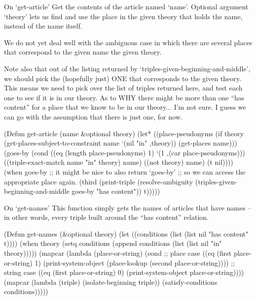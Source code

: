 \begin{notate}{On `get-article'} \label{get-article}
Get the contents of the article named `name'.  Optional
argument `theory' lets us find and use the place in the
given theory that holds the name, instead of the name
itself.

We do not yet deal well with the ambiguous case in which
there are several places that correspond to the given name
the given theory.

Note also that out of the listing returned by
`triples-given-beginning-and-middle', we should pick the
(hopefully just) ONE that corresponds to the given theory.
This means we need to pick over the list of triples
returned here, and test each one to see if it is in our
theory.  As to WHY there might be more than one ``has
content'' for a place that we know to be in our
theory... I'm not sure.  I guess we can go with the
assumption that there is just one, for now.
\end{notate}

\begin{elisp}
(Defun get-article (name &optional theory)
  (let* ((place-pseudonyms
          (if theory
              (get-places-subject-to-constraint
               name `(nil "in" ,theory))
            (get-places name)))
         (goes-by (cond
                    ((eq (length place-pseudonyms) 1)
                     `(1 ,(car place-pseudonyms)))
                    ((triple-exact-match
                      name "in" theory)
                     name)
                    ((not theory) name)
                    (t nil))))
    (when goes-by
      ;; it might be nice to also return `goes-by'
      ;; so we can access the appropriate place again.
      (third (print-triple
              (resolve-ambiguity
               (triples-given-beginning-and-middle
                goes-by "has content"))
              t)))))
\end{elisp}

\begin{notate}{On `get-names'} \label{get-names}
This function simply gets the names of articles that have
names -- in other words, every triple built around the
``has content'' relation.
\end{notate}

\begin{elisp}
(Defun get-names (&optional theory)
  (let ((conditions (list (list nil "has content" t))))
    (when theory
      (setq conditions
            (append conditions
                    (list (list nil "in" theory)))))
    (mapcar
     (lambda (place-or-string)
       (cond
         ;; place case
         ((eq (first place-or-string) 1)
          (print-system-object
           (place-lookup (second place-or-string))))
         ;; string case
         ((eq (first place-or-string) 0)
          (print-system-object place-or-string))))
     (mapcar
      (lambda (triple)
        (isolate-beginning triple))
      (satisfy-conditions conditions)))))
\end{elisp}

